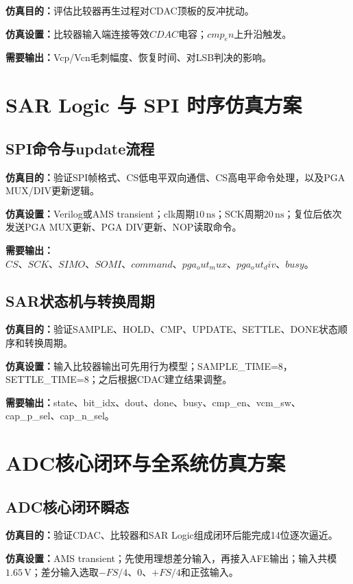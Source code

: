 \documentclass[12pt,a4paper]{ctexart}
\begin{document}
\textbf{仿真目的：}评估比较器再生过程对CDAC顶板的反冲扰动。

\textbf{仿真设置：}比较器输入端连接等效$CDAC$电容；$cmp_en$上升沿触发。

\textbf{需要输出：}Vcp/Vcn毛刺幅度、恢复时间、对LSB判决的影响。

\section{SAR Logic 与 SPI 时序仿真方案}

\subsection{SPI命令与update流程}

\textbf{仿真目的：}验证SPI帧格式、CS低电平双向通信、CS高电平命令处理，以及PGA MUX/DIV更新逻辑。

\textbf{仿真设置：}Verilog或AMS transient；clk周期$10\,\mathrm{ns}$；SCK周期$20\,\mathrm{ns}$；复位后依次发送PGA MUX更新、PGA DIV更新、NOP读取命令。

\textbf{需要输出：}$CS、SCK、SIMO、SOMI、command、pga_out_mux、pga_out_div、busy$。

\subsection{SAR状态机与转换周期}

\textbf{仿真目的：}验证SAMPLE、HOLD、CMP、UPDATE、SETTLE、DONE状态顺序和转换周期。

\textbf{仿真设置：}输入比较器输出可先用行为模型；SAMPLE_TIME=8，SETTLE_TIME=8；之后根据CDAC建立结果调整。

\textbf{需要输出：}state、bit_idx、dout、done、busy、cmp_en、vcm_sw、cap_p_sel、cap_n_sel。

\section{ADC核心闭环与全系统仿真方案}

\subsection{ADC核心闭环瞬态}

\textbf{仿真目的：}验证CDAC、比较器和SAR Logic组成闭环后能完成14位逐次逼近。

\textbf{仿真设置：}AMS transient；先使用理想差分输入，再接入AFE输出；输入共模$1.65\,\mathrm{V}$；差分输入选取$-FS/4$、0、$+FS/4$和正弦输入。
\end{document}
